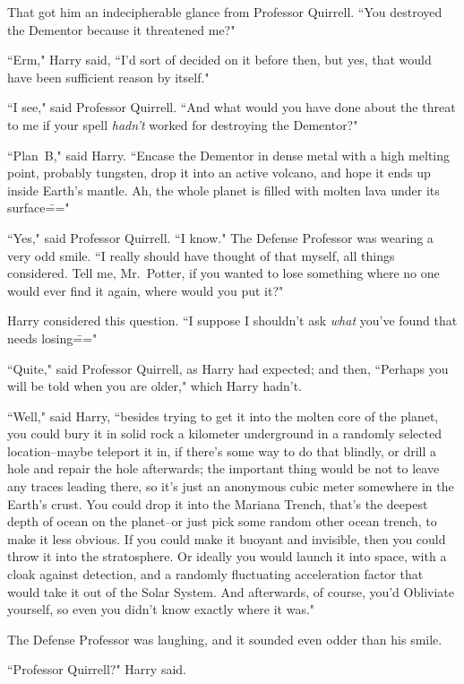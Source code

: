 That got him an indecipherable glance from Professor Quirrell. ``You destroyed the Dementor because it threatened me?"

``Erm," Harry said, ``I'd sort of decided on it before then, but yes, that would have been sufficient reason by itself."

``I see," said Professor Quirrell. ``And what would you have done about the threat to me if your spell \emph{hadn't} worked for destroying the Dementor?"

``Plan~B," said Harry. ``Encase the Dementor in dense metal with a high melting point, probably tungsten, drop it into an active volcano, and hope it ends up inside Earth's mantle. Ah, the whole planet is filled with molten lava under its surface\==="

``Yes," said Professor Quirrell. ``I know." The Defense Professor was wearing a very odd smile. ``I really should have thought of that myself, all things considered. Tell me, Mr.~Potter, if you wanted to lose something where no one would ever find it again, where would you put it?"

Harry considered this question. ``I suppose I shouldn't ask \emph{what} you've found that needs losing\==="

``Quite," said Professor Quirrell, as Harry had expected; and then, ``Perhaps you will be told when you are older," which Harry hadn't.

``Well," said Harry, ``besides trying to get it into the molten core of the planet, you could bury it in solid rock a kilometer underground in a randomly selected location\---maybe teleport it in, if there's some way to do that blindly, or drill a hole and repair the hole afterwards; the important thing would be not to leave any traces leading there, so it's just an anonymous cubic meter somewhere in the Earth's crust. You could drop it into the Mariana Trench, that's the deepest depth of ocean on the planet\---or just pick some random other ocean trench, to make it less obvious. If you could make it buoyant and invisible, then you could throw it into the stratosphere. Or ideally you would launch it into space, with a cloak against detection, and a randomly fluctuating acceleration factor that would take it out of the Solar System. And afterwards, of course, you'd Obliviate yourself, so even you didn't know exactly where it was."

The Defense Professor was laughing, and it sounded even odder than his smile.

``Professor Quirrell?" Harry said.

